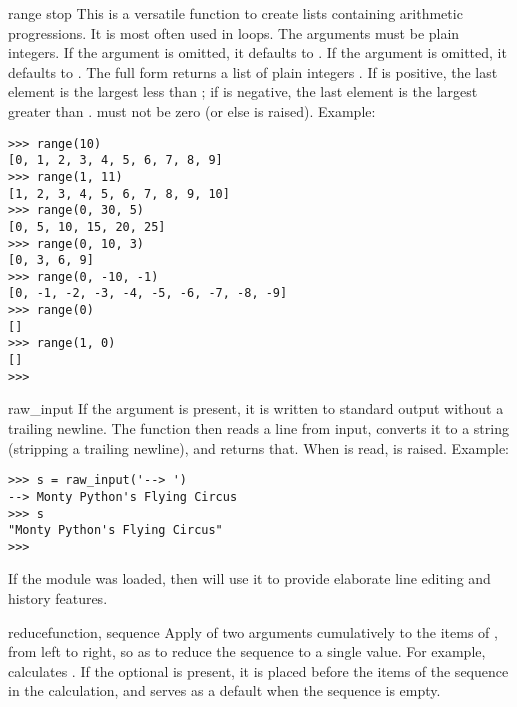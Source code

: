 \begin{funcdesc}{range}{ stop}
  This is a versatile function to create lists containing arithmetic
  progressions.  It is most often used in  loops.  The
  arguments must be plain integers.  If the  argument is
  omitted, it defaults to .  If the  argument is
  omitted, it defaults to .  The full form returns a list of
  plain integers .  If  is positive,
  the last element is the largest  less than ; if  is negative, the last
  element is the largest 
  greater than .   must not be zero (or else
   is raised).  Example:

\begin{verbatim}
>>> range(10)
[0, 1, 2, 3, 4, 5, 6, 7, 8, 9]
>>> range(1, 11)
[1, 2, 3, 4, 5, 6, 7, 8, 9, 10]
>>> range(0, 30, 5)
[0, 5, 10, 15, 20, 25]
>>> range(0, 10, 3)
[0, 3, 6, 9]
>>> range(0, -10, -1)
[0, -1, -2, -3, -4, -5, -6, -7, -8, -9]
>>> range(0)
[]
>>> range(1, 0)
[]
>>> 
\end{verbatim}
\end{funcdesc}

\begin{funcdesc}{raw_input}{}
  If the  argument is present, it is written to standard output
  without a trailing newline.  The function then reads a line from input,
  converts it to a string (stripping a trailing newline), and returns that.
  When \EOF{} is read,  is raised. Example:

\begin{verbatim}
>>> s = raw_input('--> ')
--> Monty Python's Flying Circus
>>> s
"Monty Python's Flying Circus"
>>> 
\end{verbatim}

If the  module was loaded, then
 will use it to provide elaborate
line editing and history features.
\end{funcdesc}

\begin{funcdesc}{reduce}{function, sequence}
Apply  of two arguments cumulatively to the items of
, from left to right, so as to reduce the sequence to
a single value.  For example,
 calculates
.
If the optional  is present, it is placed before the
items of the sequence in the calculation, and serves as a default when
the sequence is empty.
\end{funcdesc}

